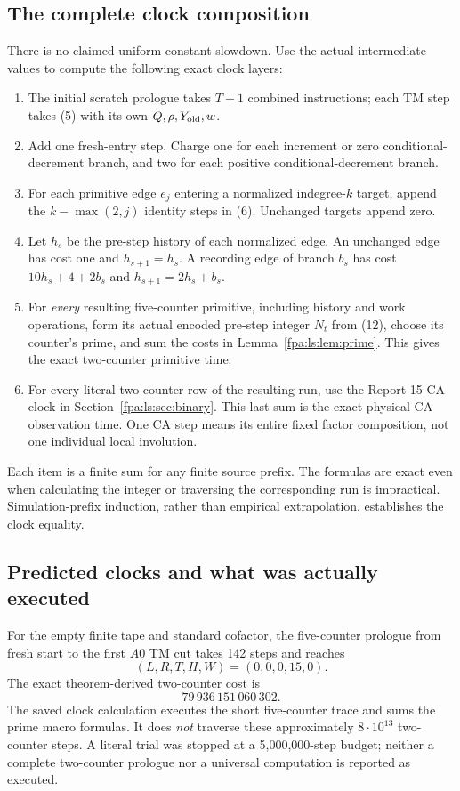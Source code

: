 \documentclass[11pt,a4paper]{article}
\numberwithin{equation}{section}
\begin{document}
\subsection{The complete clock composition}
There is no claimed uniform constant slowdown. Use the actual intermediate
values to compute the following exact clock layers:
\begin{enumerate}
\item The initial scratch prologue takes $T+1$ combined instructions; each
TM step takes (5) with its own $Q,\rho,Y_{\rm old},w$.
\item Add one fresh-entry step. Charge one for each increment or zero
conditional-decrement branch, and two for each positive
conditional-decrement branch.
\item For each primitive edge $e_j$ entering a normalized indegree-$k$
target, append the $k-\max(2,j)$ identity steps in (6). Unchanged targets
append zero.
\item Let $h_s$ be the pre-step history of each normalized edge. An unchanged
edge has cost one and $h_{s+1}=h_s$. A recording edge of branch $b_s$ has
cost $10h_s+4+2b_s$ and $h_{s+1}=2h_s+b_s$.
\item For \emph{every} resulting five-counter primitive, including history
and work operations, form its actual encoded pre-step integer $N_t$ from
(12), choose its counter's prime, and sum the costs in Lemma~\ref{fpa:ls:lem:prime}.
This gives the exact two-counter primitive time.
\item For every literal two-counter row of the resulting run, use the
Report 15 CA clock in Section~\ref{fpa:ls:sec:binary}. This last sum is the exact
physical CA observation time. One CA step means its entire fixed factor
composition, not one individual local involution.
\end{enumerate}
Each item is a finite sum for any finite source prefix. The formulas are
exact even when calculating the integer or traversing the corresponding
run is impractical. Simulation-prefix induction, rather than empirical
extrapolation, establishes the clock equality.

\subsection{Predicted clocks and what was actually executed}
For the empty finite tape and standard cofactor, the five-counter prologue
from fresh start to the first $A0$ TM cut takes 142 steps and reaches
\[
                         (L,R,T,H,W)=(0,0,0,15,0).
\]
The exact theorem-derived two-counter cost is
\[
                              79\,936\,151\,060\,302.   \tag{24}
\]
The saved clock calculation executes the short five-counter trace and sums
the prime macro formulas. It does \emph{not} traverse these approximately
$8\cdot10^{13}$ two-counter steps. A literal trial was stopped at a
5,000,000-step budget; neither a complete two-counter prologue nor a
universal computation is reported as executed.
\end{document}
